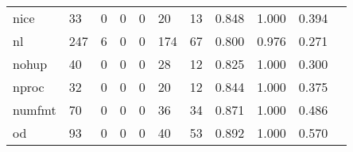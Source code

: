 \begin{longtable}{lp{1.2cm}p{1.2cm}p{1.2cm}p{1.2cm}p{1.2cm}p{1.2cm}p{1.2cm}p{1.2cm}p{1.2cm}p{1.2cm}}
nice      &                                    33 &                                                  0 &                                                  0 &                                                  0 &                                                 20 &                                                 13 &                                         0.848 &                                              1.000 &                                              0.394 \\
nl        &                                   247 &                                                  6 &                                                  0 &                                                  0 &                                                174 &                                                 67 &                                         0.800 &                                              0.976 &                                              0.271 \\
nohup     &                                    40 &                                                  0 &                                                  0 &                                                  0 &                                                 28 &                                                 12 &                                         0.825 &                                              1.000 &                                              0.300 \\
nproc     &                                    32 &                                                  0 &                                                  0 &                                                  0 &                                                 20 &                                                 12 &                                         0.844 &                                              1.000 &                                              0.375 \\
numfmt    &                                    70 &                                                  0 &                                                  0 &                                                  0 &                                                 36 &                                                 34 &                                         0.871 &                                              1.000 &                                              0.486 \\
od        &                                    93 &                                                  0 &                                                  0 &                                                  0 &                                                 40 &                                                 53 &                                         0.892 &                                              1.000 &                                              0.570 \\

\end{longtable}
